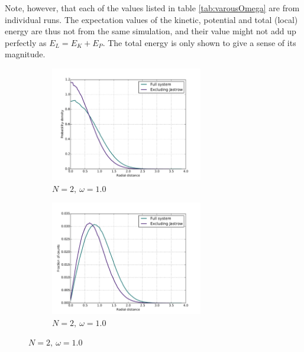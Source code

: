 \documentclass[english, a4paper]{article}
\begin{document}
	Note, however, that each of the values listed in table \ref{tab:varousOmega} are from individual runs.
	The expectation values of the kinetic, potential and total (local) energy are thus not from the same simulation, and their value might not add up perfectly as $E_L = E_K + E_P$.
	The total energy is only shown to give a sense of its magnitude.
	

\newpage



\begin{figure}[H]
	
	\begin{subfigure}{0.5\textwidth}
		\includegraphics[width=\textwidth, height= 5cm]{figures/radialDistribution/OneBodyDensityN2w100Se7.pdf}
		\caption{$N=2,\:\omega=1.0$}
	\end{subfigure}
	\begin{subfigure}{0.5\textwidth}
		\includegraphics[width=\textwidth, height= 5cm]{figures/radialDistribution/radialDistributionN2w100Se7.pdf}
		\caption{$N=2,\:\omega=1.0$}
	\end{subfigure}
	
	\vspace{1mm}
	

\end{figure}
\end{document}

